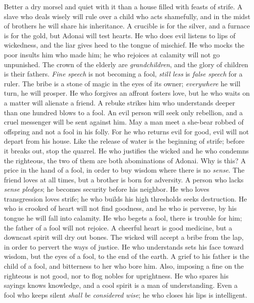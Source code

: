 \begin{biblechapter} %
\verse Better a dry morsel and quiet with it 
than a house filled with feasts of strife.
\verse A slave who deals wisely will rule over a child who acts shamefully, 
and in the midst of brothers he will share his inheritance.
\verse A crucible is for the silver, and a furnace is for the gold, 
but Adonai will test hearts.
\verse He who does evil listens to lips of wickedness, 
and the liar gives heed to the tongue of mischief.
\verse He who mocks the poor insults him who made him; 
he who rejoices at calamity will not go unpunished.
\verse The crown of the elderly are \textit{grandchildren}, 
and the glory of children is their fathers.
\verse \textit{Fine speech} is not becoming a fool, 
\textit{still less} is \textit{false speech} for a ruler.
\verse The bribe is a stone of magic in the eyes of its owner; 
\textit{everywhere} he will turn, he will prosper.
\verse He who forgives an affront fosters love, 
but he who waits on a matter will alienate a friend.
\verse A rebuke strikes him who understands 
deeper than one hundred blows to a fool.
\verse An evil person will seek only rebellion, 
and a cruel messenger will be sent against him.
\verse May a man meet a she-bear robbed of offspring 
and not a fool in his folly.
\verse For he who returns evil for good, 
evil will not depart from his house.
\verse Like the release of water is the beginning of strife; 
before it breaks out, stop the quarrel.
\verse He who justifies the wicked and he who condemns the righteous, 
the two of them are both abominations of Adonai.
\verse Why is this? A price in the hand of a fool, 
in order to buy wisdom where there is no \textit{sense}.
\verse The friend loves at all times, 
but a brother is born for adversity.
\verse A person who lacks \textit{sense} \textit{pledges}; 
he becomes security before his neighbor.
\verse He who loves transgression loves strife; 
he who builds his high thresholds seeks destruction.
\verse He who is crooked of heart will not find goodness, 
and he who is perverse, by his tongue he will fall into calamity.
\verse He who begets a fool, there is trouble for him; 
the father of a fool will not rejoice.
\verse A cheerful heart is good medicine, 
but a downcast spirit will dry out bones.
\verse The wicked will accept a bribe from the lap, 
in order to pervert the ways of justice.
\verse He who understands sets his face toward wisdom, 
but the eyes of a fool, to the end of the earth.
\verse A grief to his father is the child of a fool, 
and bitterness to her who bore him.
\verse Also, imposing a fine on the righteous is not good, 
nor to flog nobles for uprightness.
\verse He who spares his sayings knows knowledge, 
and a cool spirit is a man of understanding.
\verse Even a fool who keeps silent \textit{shall be considered wise}; 
he who closes his lips is intelligent.
\end{biblechapter}

